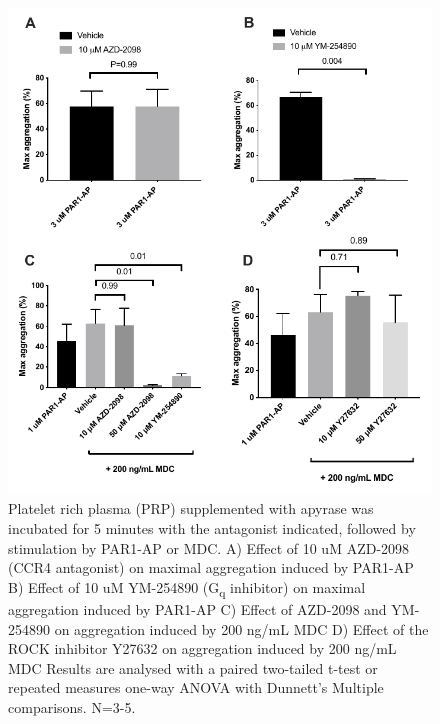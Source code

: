 \documentclass[11pt,twoside]{bristolthesis}
\begin{document}
\begin{figure}
\includegraphics[width=0.95\linewidth]{figure/Chemokines/Layouts/PAR1_MDC_inhibitors_aggregation} \caption[The effect of inhibitors on PAR1-AP and MDC induced aggregation in PRP.]{Platelet rich plasma (PRP) supplemented with apyrase was incubated for 5 minutes with the antagonist indicated, followed by stimulation by PAR1-AP or MDC. A) Effect of 10 uM AZD-2098 (CCR4 antagonist) on maximal aggregation induced by PAR1-AP B) Effect of 10 uM YM-254890 (G\textsubscript{q} inhibitor) on maximal aggregation induced by PAR1-AP C) Effect of AZD-2098 and YM-254890 on aggregation induced by 200 ng/mL MDC D) Effect of the ROCK inhibitor Y27632 on aggregation induced by 200 ng/mL MDC Results are analysed with a paired two-tailed t-test or repeated measures one-way ANOVA with Dunnett's Multiple comparisons. N=3-5.}\label{fig:MDC-PRP-agg-bar}
\end{figure}
\end{document}
